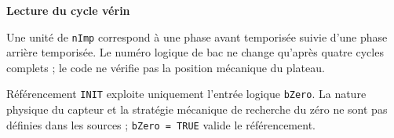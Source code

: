 {  \begin{primarycard}
    \textbf{Lecture du cycle vérin}\par\small
    Une unité de \texttt{nImp} correspond à une phase avant temporisée suivie d'une phase arrière temporisée. Le numéro logique de bac ne change qu'après quatre cycles complets ; le code ne vérifie pas la position mécanique du plateau.
  \end{primarycard}

  \begin{notebox}[colback=ekwarning,colframe=orange!35]{Référencement}
    \texttt{INIT} exploite uniquement l'entrée logique \texttt{bZero}. La nature physique du capteur et la stratégie mécanique de recherche du zéro ne sont pas définies dans les sources ; \texttt{bZero = TRUE} valide le référencement.
  \end{notebox}
}

\newpage

